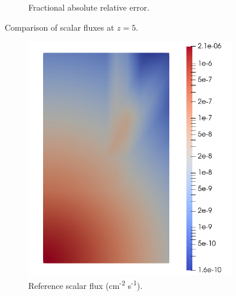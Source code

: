 \begin{figure}[H]
\begin{subfigure}[b]{0.47\textwidth}
        \caption{Fractional absolute relative error.}
        \label{fig:verification:sasf:error_z5}
    \end{subfigure}
    \caption{Comparison of scalar fluxes at $z = 5$.}
    \label{fig:verification:sasf:z5}
\end{figure}
\begin{figure}[H]
    \centering
    \begin{subfigure}[b]{0.47\textwidth}
        \centering
        \includegraphics[width=\textwidth]{images/verification/sasf_kobayashi/rt_z35.png}
        \caption{Reference scalar flux (cm\textsuperscript{-2} s\textsuperscript{-1}).}
        \label{fig:verification:sasf:ref_z35}
    \end{subfigure}
    \hfill
    \begin{subfigure}[b]{0.47\textwidth}
        \centering

\end{subfigure}
\end{figure}
